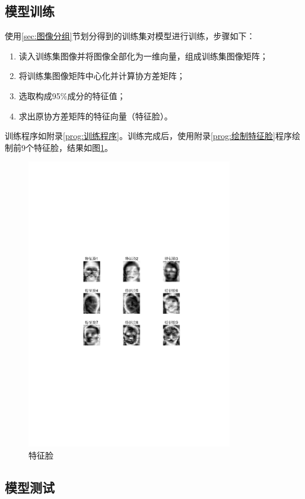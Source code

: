 \documentclass[a4paper]{ctexart}
\begin{document}
\subsection{模型训练}\label{sec:模型训练}
使用\ref{sec:图像分组}节划分得到的训练集对模型进行训练，步骤如下：
\begin{enumerate}[label=\arabic*、]
	\item 读入训练集图像并将图像全部化为一维向量，组成训练集图像矩阵；
	\item 将训练集图像矩阵中心化并计算协方差矩阵；
	\item 选取构成95\%成分的特征值；
	\item 求出原协方差矩阵的特征向量（特征脸）。
\end{enumerate}
训练程序如附录\ref{prog:训练程序}。训练完成后，使用附录\ref{prog:绘制特征脸}程序绘制前9个特征脸，结果如图\ref{figure:特征脸}。
\begin{figure}[htbp]
	\centering
	\includegraphics[width=0.8\textwidth]{figure/1.pdf}
	\caption{特征脸}\label{figure:特征脸}
\end{figure}

\subsection{模型测试}
\end{document}

